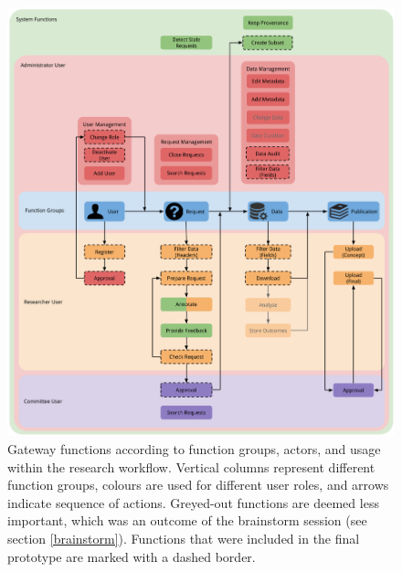 
\begin{figure}[!htb]
	\centering
	\includegraphics[width=1.0\linewidth]{images/functions-in-workflow}
	\caption{
		Gateway functions according to function groups, actors, and usage within the research workflow.
		Vertical columns represent different function groups, colours are used for different user roles, and arrows indicate sequence of actions. 
		Greyed-out functions are deemed less important, which was an outcome of the brainstorm session (see section \ref{brainstorm}).
		Functions that were included in the final prototype are marked with a dashed border.
	}
	\label{fig:functions-workflow}
\end{figure}